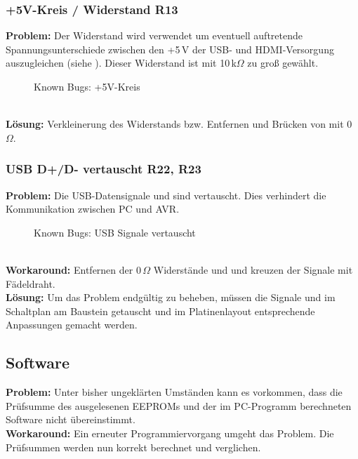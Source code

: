 \subsubsection{+5V-Kreis / Widerstand R13}
\textbf{Problem:} Der Widerstand  wird verwendet um eventuell auftretende Spannungsunterschiede zwischen den +5\,V der USB- und HDMI-Versorgung auszugleichen (siehe ). Dieser Widerstand ist mit 10\,k$\Omega$ zu groß gewählt.
\begin{figure}[htp]
	\center
    \caption{Known Bugs: +5V-Kreis}
    \label{fig:r13}
\end{figure}\\
\textbf{Lösung:} Verkleinerung des Widerstands bzw. Entfernen und Brücken von  mit 0\,$\Omega$.
\subsubsection{USB D+/D- vertauscht R22, R23}
\textbf{Problem:} Die USB-Datensignale  und  sind vertauscht. Dies verhindert die Kommunikation zwischen PC und AVR.
\begin{figure}[htp]
	\center
    \caption{Known Bugs: USB Signale vertauscht}
    \label{fig:r13}
\end{figure}\\
\textbf{Workaround:} Entfernen der 0\,$\Omega$ Widerstände  und  und kreuzen der Signale mit Fädeldraht.\\
\textbf{Lösung:} Um das Problem endgültig zu beheben, müssen die Signale  und  im Schaltplan am Baustein  getauscht und im Platinenlayout entsprechende Anpassungen gemacht werden.
\subsection{Software}
\textbf{Problem:} Unter bisher ungeklärten Umständen kann es vorkommen, dass die Prüfsumme des ausgelesenen EEPROMs und der im PC-Programm berechneten Software nicht übereinstimmt. \\
\textbf{Workaround:} Ein erneuter Programmiervorgang umgeht das Problem. Die Prüfsummen werden nun korrekt berechnet und verglichen.